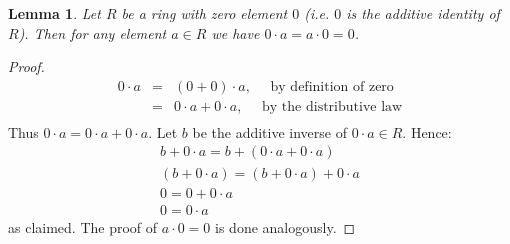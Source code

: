 \documentclass[12pt]{article}
\newtheorem{lemma}{Lemma}
\begin{document}
\begin{lemma}
Let $R$ be a ring with zero element $0$ (i.e. $0$ is the additive identity of $R$). Then for any element $a\in R$ we have $0\cdot a = a\cdot 0 = 0$.
\end{lemma}
\begin{proof}
\begin{eqnarray*}
0\cdot a &=& (0+0)\cdot a , \quad \text{ by definition of zero}\\
&=& 0\cdot a + 0\cdot a, \quad \text{ by the distributive law}\\
\end{eqnarray*}
Thus $0\cdot a=0\cdot a + 0\cdot a$. Let $b$ be the additive inverse of $0\cdot a \in R$. Hence:
\begin{eqnarray*}
b+0\cdot a=b+(0\cdot a + 0\cdot a)\\
(b+0\cdot a)=(b+0\cdot a) + 0\cdot a\\
0=0 + 0\cdot a\\
0=0\cdot a
\end{eqnarray*}
as claimed. The proof of $a\cdot 0=0$ is done analogously.
\end{proof}
\end{document}
